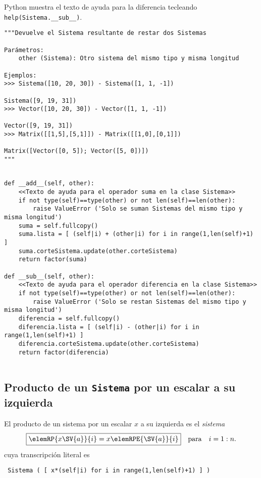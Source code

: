 \documentclass[11pt]{report}
\begin{document}
Python muestra el texto de ayuda para la diferencia tecleando \texttt{help(Sistema.\_\_sub\_\_)}.
\begin{verbatim}
"""Devuelve el Sistema resultante de restar dos Sistemas

Parámetros: 
    other (Sistema): Otro sistema del mismo tipo y misma longitud

Ejemplos:
>>> Sistema([10, 20, 30]) - Sistema([1, 1, -1])

Sistema([9, 19, 31])
>>> Vector([10, 20, 30]) - Vector([1, 1, -1])

Vector([9, 19, 31])
>>> Matrix([[1,5],[5,1]]) - Matrix([[1,0],[0,1]]) 

Matrix([Vector([0, 5]); Vector([5, 0])]) 
"""
\end{verbatim}

\begin{verbatim}

def __add__(self, other):
    <<Texto de ayuda para el operador suma en la clase Sistema>>
    if not type(self)==type(other) or not len(self)==len(other):
        raise ValueError ('Solo se suman Sistemas del mismo tipo y misma longitud')
    suma = self.fullcopy()
    suma.lista = [ (self|i) + (other|i) for i in range(1,len(self)+1) ]
    suma.corteSistema.update(other.corteSistema)
    return factor(suma)
            
def __sub__(self, other):
    <<Texto de ayuda para el operador diferencia en la clase Sistema>>
    if not type(self)==type(other) or not len(self)==len(other):
        raise ValueError ('Solo se restan Sistemas del mismo tipo y misma longitud')
    diferencia = self.fullcopy()
    diferencia.lista = [ (self|i) - (other|i) for i in range(1,len(self)+1) ]
    diferencia.corteSistema.update(other.corteSistema)
    return factor(diferencia)
            
\end{verbatim}

\subsection{Producto de un \texttt{Sistema} por un escalar a su izquierda}
\label{sec:org67c960b}

El producto de un sistema  por un escalar \(x\) a su izquierda es
el \emph{sistema}
\begin{displaymath}
  \fbox{\begin{math} 
      \elemRP{x\SV{a}}{i}=x \elemRPE{\SV{a}}{i}
  \end{math}}\quad\text{para}\quad i=1:n.
\end{displaymath}
cuya transcripción literal es
\begin{center}
  \Verb/ Sistema ( [ x*(self|i) for i in range(1,len(self)+1) ] ) /
\end{center}
\end{document}
